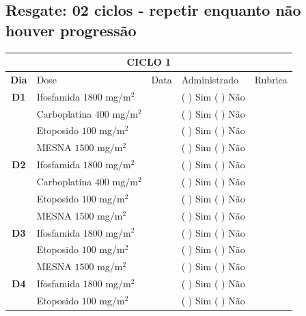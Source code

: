 \documentclass[11pt,a4paper,oldfontcommands]{memoir}
\begin{document}
\subsection{Resgate: 02 ciclos - repetir enquanto não houver progressão}

\begin{center}
\begin{table}[H]
\begin{tabular}{c|p{5cm}|p{1.4cm}|p{4cm}|p{2.8cm}}
	\hline
	\multicolumn{5}{c}{\textbf{CICLO 1}}\\
\hline
    \multicolumn{1}{c|}{\multirow{1}{*}{\textbf{Dia}}}&{Dose}&{Data}&{Administrado}&{Rubrica} \\
    \hline
    \multicolumn{1}{c|}{\multirow{1}{*}{\textbf{D1}}}&{Ifosfamida \(1800\) mg/m\(^2\)}&&{(  ) Sim (  ) Não}&\\
    \multicolumn{1}{c|}{\multirow{1}{*}{\textbf{}}}&{Carboplatina \(400\) mg/m\(^2\)}&&{(  ) Sim (  ) Não}&\\
    \multicolumn{1}{c|}{\multirow{1}{*}{\textbf{}}}&{Etoposido \(100\) mg/m\(^2\)}&&{(  ) Sim (  ) Não}&\\
    \multicolumn{1}{c|}{\multirow{1}{*}{\textbf{}}}&{MESNA \(1500\) mg/m\(^2\)}&&{(  ) Sim (  ) Não}&\\
    \multicolumn{1}{c|}{\multirow{1}{*}{\textbf{D2}}}&{Ifosfamida \(1800\) mg/m\(^2\)}&&{(  ) Sim (  ) Não}&\\
    \multicolumn{1}{c|}{\multirow{1}{*}{\textbf{}}}&{Carboplatina \(400\) mg/m\(^2\)}&&{(  ) Sim (  ) Não}&\\
    \multicolumn{1}{c|}{\multirow{1}{*}{\textbf{}}}&{Etoposido \(100\) mg/m\(^2\)}&&{(  ) Sim (  ) Não}&\\
    \multicolumn{1}{c|}{\multirow{1}{*}{\textbf{}}}&{MESNA \(1500\) mg/m\(^2\)}&&{(  ) Sim (  ) Não}&\\
    \multicolumn{1}{c|}{\multirow{1}{*}{\textbf{D3}}}&{Ifosfamida \(1800\) mg/m\(^2\)}&&{(  ) Sim (  ) Não}&\\
    \multicolumn{1}{c|}{\multirow{1}{*}{\textbf{}}}&{Etoposido \(100\) mg/m\(^2\)}&&{(  ) Sim (  ) Não}&\\
    \multicolumn{1}{c|}{\multirow{1}{*}{\textbf{}}}&{MESNA \(1500\) mg/m\(^2\)}&&{(  ) Sim (  ) Não}&\\
    \multicolumn{1}{c|}{\multirow{1}{*}{\textbf{D4}}}&{Ifosfamida \(1800\) mg/m\(^2\)}&&{(  ) Sim (  ) Não}&\\
    \multicolumn{1}{c|}{\multirow{1}{*}{\textbf{}}}&{Etoposido \(100\) mg/m\(^2\)}&&{(  ) Sim (  ) Não}&\\

\end{tabular}
\end{table}
\end{center}
\end{document}
